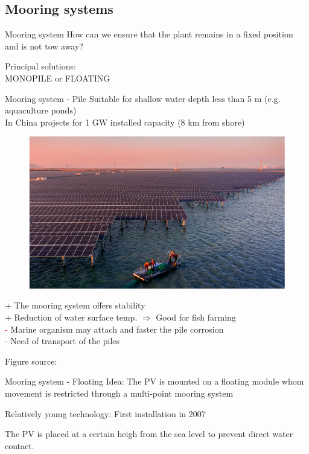 \documentclass[aspectratio=169, 12pt]{beamer}
\begin{document}
\subsection{Mooring systems}
\begin{frame}{Mooring system}
  How can we ensure that the plant remains in a fixed position and is not tow away?

  Principal solutions:\\
  \textcolor{NTNUBlue}{MONOPILE} or \textcolor{NTNUBlue}{FLOATING}
  
\end{frame}

\begin{frame}{Mooring system - Pile}
  Suitable for shallow water depth less than 5 m (e.g. aquaculture ponds)\\
  In China projects for 1 GW installed capacity (8 km from shore)

  \begin{figure}
    \centering
    \includegraphics[width=0.3\columnwidth]{figure/floating_PV_china.png}
  \end{figure}

  \textcolor{NTNUgreen}{+} The mooring system offers stability\\
  \textcolor{NTNUgreen}{+} Reduction of water surface temp. $\Rightarrow$ Good for fish farming\\
  \textcolor{red}{-} Marine organism may attach and faster the pile corrosion\\
  \textcolor{red}{-} Need of transport of the piles

  {\tiny Figure source: \cite{jmse11112064}}
\end{frame}

\begin{frame}{Mooring system - Floating}
  \textcolor{NTNUBlue}{Idea:} The PV is mounted on a floating module whom movement is restricted through a multi-point mooring system 
  
  \textcolor{NTNUBlue}{Relatively young technology: }First installation in 2007

  The PV is placed at a certain heigh from the sea level to prevent direct water contact.
\end{frame}
\end{document}
